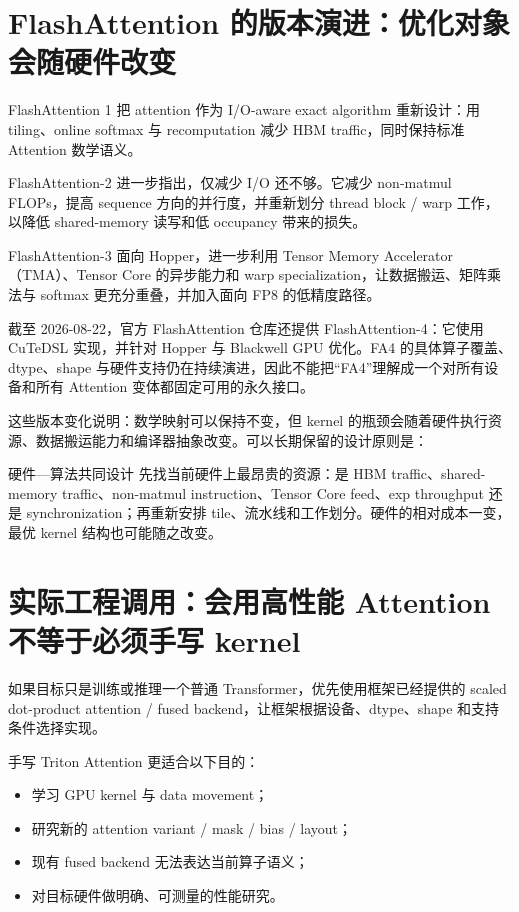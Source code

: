\documentclass[profile=standard,twoside=false]{ipara-handbook}
\begin{document}
\section{FlashAttention 的版本演进：优化对象会随硬件改变}

FlashAttention 1 把 attention 作为 I/O-aware exact algorithm 重新设计：用 tiling、online softmax 与 recomputation 减少 HBM traffic，同时保持标准 Attention 数学语义。

FlashAttention-2 进一步指出，仅减少 I/O 还不够。它减少 non-matmul FLOPs，提高 sequence 方向的并行度，并重新划分 thread block / warp 工作，以降低 shared-memory 读写和低 occupancy 带来的损失。

FlashAttention-3 面向 Hopper，进一步利用 Tensor Memory Accelerator（TMA）、Tensor Core 的异步能力和 warp specialization，让数据搬运、矩阵乘法与 softmax 更充分重叠，并加入面向 FP8 的低精度路径。

截至 2026-08-22，官方 FlashAttention 仓库还提供 FlashAttention-4：它使用 CuTeDSL 实现，并针对 Hopper 与 Blackwell GPU 优化。FA4 的具体算子覆盖、dtype、shape 与硬件支持仍在持续演进，因此不能把“FA4”理解成一个对所有设备和所有 Attention 变体都固定可用的永久接口。

这些版本变化说明：数学映射可以保持不变，但 kernel 的瓶颈会随着硬件执行资源、数据搬运能力和编译器抽象改变。可以长期保留的设计原则是：

\begin{mentalmodel}{硬件—算法共同设计}
先找当前硬件上最昂贵的资源：是 HBM traffic、shared-memory traffic、non-matmul instruction、Tensor Core feed、exp throughput 还是 synchronization；再重新安排 tile、流水线和工作划分。硬件的相对成本一变，最优 kernel 结构也可能随之改变。
\end{mentalmodel}

\section{实际工程调用：会用高性能 Attention 不等于必须手写 kernel}

如果目标只是训练或推理一个普通 Transformer，优先使用框架已经提供的 scaled dot-product attention / fused backend，让框架根据设备、dtype、shape 和支持条件选择实现。

手写 Triton Attention 更适合以下目的：

\begin{itemize}
  \item 学习 GPU kernel 与 data movement；
  \item 研究新的 attention variant / mask / bias / layout；
  \item 现有 fused backend 无法表达当前算子语义；
  \item 对目标硬件做明确、可测量的性能研究。
\end{itemize}
\end{document}
